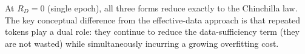 At $R_D = 0$ (single epoch), all three forms reduce exactly to the Chinchilla law. The key conceptual difference from the effective-data approach is that repeated tokens play a dual role: they continue to reduce the data-sufficiency term (they are not wasted) while simultaneously incurring a growing overfitting cost. 
